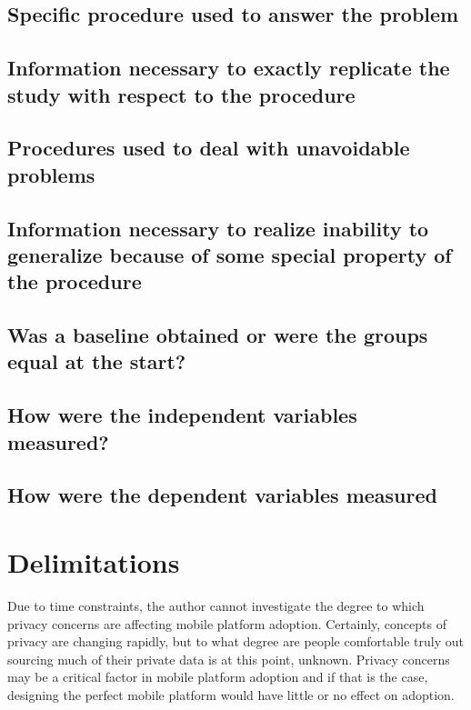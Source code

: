 \documentclass[12pt,oneside,letterpaper,titlepage]{article}
\begin{document}
\subsection{Specific procedure used to answer the problem}

\subsection{Information necessary to exactly replicate the study with respect to the procedure}

\subsection{Procedures used to deal with unavoidable problems}

\subsection{Information necessary to realize inability to generalize because of some special property of the procedure}

\subsection{Was a baseline obtained or were the groups equal at the start?}

\subsection{How were the independent variables measured?}

\subsection{How were the dependent variables measured}

\section{Delimitations}


Due to time constraints, the author cannot investigate the degree to which
privacy concerns are affecting mobile platform adoption.  Certainly, concepts of
privacy are changing rapidly, but to what degree are people comfortable truly
out sourcing much of their private data is at this point, unknown.  Privacy
concerns may be a critical factor in mobile platform adoption and if that is the
case, designing the perfect mobile platform would have little or no effect on
adoption.
\end{document}
